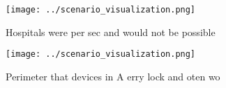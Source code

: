 \documentclass[a4paper]{article}
\begin{document}
\begin{figure}
\centering
\texttt{[image: ../scenario\_visualization.png]}
\caption{Hospitals were per sec and would not be possible 
}
\end{figure}
 
\begin{figure}
\centering
\texttt{[image: ../scenario\_visualization.png]}
\caption{Perimeter that devices in A erry lock and oten wo
}
\end{figure}
 
\end{document}
